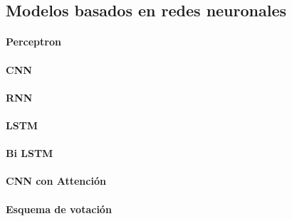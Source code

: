 \subsection{Modelos basados en redes neuronales}

\paragraph{Perceptron}
\paragraph{CNN}
\paragraph{RNN}
\paragraph{LSTM}
\paragraph{Bi LSTM}
\paragraph{CNN con Attención}
\paragraph{Esquema de votación}

